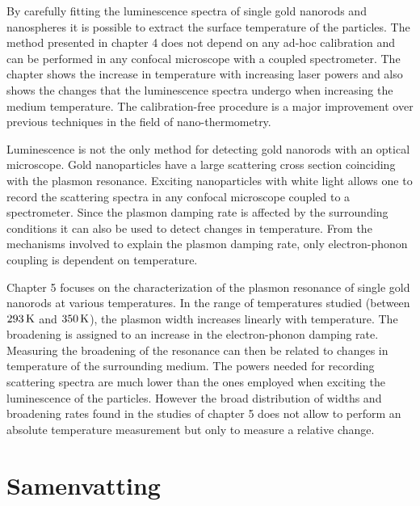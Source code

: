 By carefully fitting the luminescence spectra of single gold nanorods and
nanospheres it is possible to extract the surface temperature of the particles.
The method presented in chapter 4 does not depend on any ad-hoc calibration and
can be performed in any confocal microscope with a coupled spectrometer. The
chapter shows the increase in temperature with increasing laser powers and also
shows the changes that the luminescence spectra undergo when increasing the
medium temperature. The calibration-free procedure is a major improvement over previous techniques
in the field of nano-thermometry.

Luminescence is not the only method for detecting gold nanorods with an optical
microscope. Gold nanoparticles have a large scattering cross section coinciding
with the plasmon resonance. Exciting nanoparticles with white light allows one
to record the scattering spectra in any confocal microscope coupled to a
spectrometer. Since the plasmon damping rate is affected by the surrounding
conditions it can also be used to detect changes in temperature. From the
mechanisms involved to explain the plasmon damping rate, only electron-phonon
coupling is dependent on temperature. 

Chapter 5 focuses on the characterization of the plasmon resonance of single
gold nanorods at various temperatures. In the range of temperatures studied
(between $293\,\textrm{K}$ and $350\,\textrm{K}$), the plasmon width increases linearly with
temperature. The broadening is assigned to an increase in the electron-phonon
damping rate. Measuring the broadening of the resonance can then be related to
changes in temperature of the surrounding medium. The powers needed for
recording scattering spectra are much lower than the ones employed when exciting
the luminescence of the particles. However the broad distribution of widths and
broadening rates found in the studies of chapter 5 does not allow
to perform an absolute temperature measurement but only to measure a relative
change.


\chapter*{Samenvatting}

